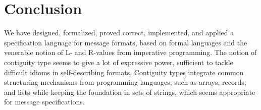 \documentclass[a4paper,UKenglish,cleveref, autoref, thm-restate]{lipics-v2021}
\begin{document}
\section{Conclusion}

We have designed, formalized, proved correct, implemented, and applied
a specification language for message formats, based on formal
languages and the venerable notion of L- and R-values from imperative
programming. The notion of contiguity type seems to give a lot of
expressive power, sufficient to tackle difficult idioms in
self-describing formats. Contiguity types integrate common structuring
mechanisms from programming languages, such as arrays, records, and
lists while keeping the foundation in sets of strings, which seems
appropriate for message specifications.


\end{document}
